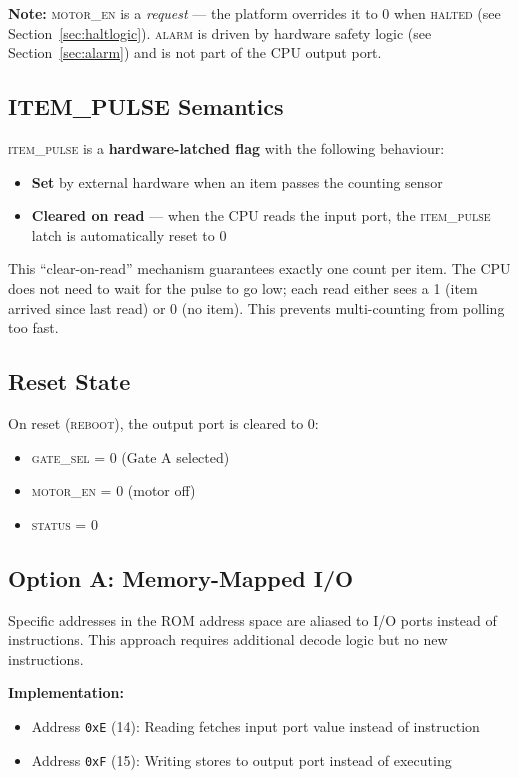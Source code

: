\documentclass[11pt,a4paper]{article}
\newcommand{\signal}[1]{\textsc{#1}}
\begin{document}
\textbf{Note:} \signal{motor\_en} is a \emph{request} --- the platform overrides it to 0 when \signal{halted} (see Section~\ref{sec:haltlogic}). \signal{alarm} is driven by hardware safety logic (see Section~\ref{sec:alarm}) and is not part of the CPU output port.

\subsection{ITEM\_PULSE Semantics}\label{sec:itempulse}

\signal{item\_pulse} is a \textbf{hardware-latched flag} with the following behaviour:
\begin{itemize}[nosep]
  \item \textbf{Set} by external hardware when an item passes the counting sensor
  \item \textbf{Cleared on read} --- when the CPU reads the input port, the \signal{item\_pulse} latch is automatically reset to 0
\end{itemize}

This ``clear-on-read'' mechanism guarantees exactly one count per item. The CPU does not need to wait for the pulse to go low; each read either sees a 1 (item arrived since last read) or 0 (no item). This prevents multi-counting from polling too fast.

\subsection{Reset State}

On reset (\signal{reboot}), the output port is cleared to 0:
\begin{itemize}[nosep]
  \item \signal{gate\_sel} = 0 (Gate A selected)
  \item \signal{motor\_en} = 0 (motor off)
  \item \signal{status} = 0
\end{itemize}

\subsection{Option A: Memory-Mapped I/O}

Specific addresses in the ROM address space are aliased to I/O ports instead of instructions. This approach requires additional decode logic but no new instructions.

\textbf{Implementation:}
\begin{itemize}[nosep]
  \item Address \texttt{0xE} (14): Reading fetches input port value instead of instruction
  \item Address \texttt{0xF} (15): Writing stores to output port instead of executing
\end{itemize}
\end{document}
